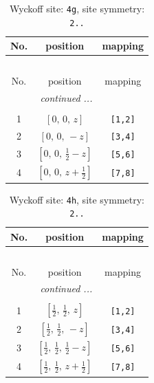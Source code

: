 \documentclass[fleqn,8pt]{jsarticle}
\begin{document}
\renewcommand{\arraystretch}{1.2}
\begin{longtable}{ccc}
\caption{Wyckoff site: {\tt 4g}, site symmetry: {\tt 2..}}
 \\
 \hline \hline
No. & position & mapping \\ \hline \endfirsthead

\multicolumn{2}{l}{\tablename\ \thetable{}} \\
 \hline \hline
No. & position & mapping \\ \hline \endhead

 \hline \hline
\multicolumn{2}{r}{\footnotesize\it continued ...} \\ \endfoot

 \hline \hline
\multicolumn{2}{r}{} \\ \endlastfoot

1 & $\left[ 0,\, 0,\, z \right]$ & {\tt [1,2]} \\ \hline
2 & $\left[ 0,\, 0,\, - z \right]$ & {\tt [3,4]} \\ \hline
3 & $\left[ 0,\, 0,\, \frac{1}{2} - z \right]$ & {\tt [5,6]} \\ \hline
4 & $\left[ 0,\, 0,\, z + \frac{1}{2} \right]$ & {\tt [7,8]} \\
\end{longtable}
\renewcommand{\arraystretch}{1.2}
\begin{longtable}{ccc}
\caption{Wyckoff site: {\tt 4h}, site symmetry: {\tt 2..}}
 \\
 \hline \hline
No. & position & mapping \\ \hline \endfirsthead

\multicolumn{2}{l}{\tablename\ \thetable{}} \\
 \hline \hline
No. & position & mapping \\ \hline \endhead

 \hline \hline
\multicolumn{2}{r}{\footnotesize\it continued ...} \\ \endfoot

 \hline \hline
\multicolumn{2}{r}{} \\ \endlastfoot

1 & $\left[ \frac{1}{2},\, \frac{1}{2},\, z \right]$ & {\tt [1,2]} \\ \hline
2 & $\left[ \frac{1}{2},\, \frac{1}{2},\, - z \right]$ & {\tt [3,4]} \\ \hline
3 & $\left[ \frac{1}{2},\, \frac{1}{2},\, \frac{1}{2} - z \right]$ & {\tt [5,6]} \\ \hline
4 & $\left[ \frac{1}{2},\, \frac{1}{2},\, z + \frac{1}{2} \right]$ & {\tt [7,8]} \\
\end{longtable}
\end{document}
